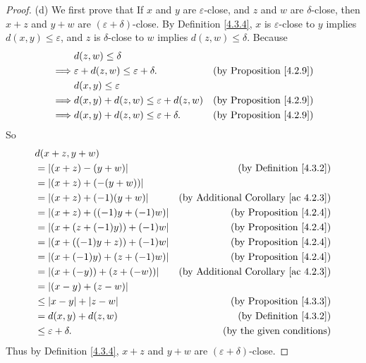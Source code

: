 \begin{proof}{(d)}
We first prove that If \(x\) and \(y\) are \(\varepsilon\)-close, and \(z\) and \(w\) are \(\delta\)-close, then \(x + z\) and \(y + w\) are \((\varepsilon + \delta)\)-close.
By Definition \ref{4.3.4}, \(x\) is \(\varepsilon\)-close to \(y\) implies \(d(x, y) \leq \varepsilon\), and \(z\) is \(\delta\)-close to \(w\) implies \(d(z, w) \leq \delta\).
Because
\begin{align*}
& d(z, w) \leq \delta \\
\implies & \varepsilon + d(z, w) \leq \varepsilon + \delta. & \text{(by Proposition \ref{4.2.9})} \\
& d(x, y) \leq \varepsilon \\
\implies & d(x, y) + d(z, w) \leq \varepsilon + d(z, w) & \text{(by Proposition \ref{4.2.9})} \\
\implies & d(x, y) + d(z, w) \leq \varepsilon + \delta. & \text{(by Proposition \ref{4.2.9})}
\end{align*}
So
\begin{align*}
& d(x + z, y + w) \\
&= |(x + z) - (y + w)| & \text{(by Definition \ref{4.3.2})} \\
&= |(x + z) + (-(y + w))| \\
&= |(x + z) + (-1)(y + w)| & \text{(by Additional Corollary \ref{ac 4.2.3})} \\
&= |(x + z) + ((-1)y + (-1)w)| & \text{(by Proposition \ref{4.2.4})} \\
&= |(x + (z + (-1)y)) + (-1)w| & \text{(by Proposition \ref{4.2.4})} \\
&= |(x + ((-1)y + z)) + (-1)w| & \text{(by Proposition \ref{4.2.4})} \\
&= |(x + (-1)y) + (z + (-1)w)| & \text{(by Proposition \ref{4.2.4})} \\
&= |(x + (-y)) + (z + (-w))| & \text{(by Additional Corollary \ref{ac 4.2.3})} \\
&= |(x - y) + (z - w)| \\
&\leq |x - y| + |z - w| & \text{(by Proposition \ref{4.3.3})} \\
&= d(x, y) + d(z, w) & \text{(by Definition \ref{4.3.2})} \\
&\leq \varepsilon + \delta. & \text{(by the given conditions)}
\end{align*}
Thus by Definition \ref{4.3.4}, \(x + z\) and \(y + w\) are \((\varepsilon + \delta)\)-close.


\end{proof}
